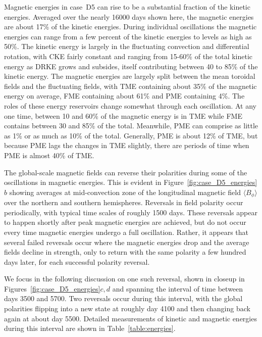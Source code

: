 Magnetic energies in case~D5 can rise to be a substantial
fraction of the kinetic energies.  Averaged over the nearly 16000 days
shown here, the magnetic energies are about 17\% of the kinetic
energies.  During individual oscillations the magnetic energies can
range from a few percent of the kinetic energies to levels as high as
50\%.  The kinetic energy is largely in the fluctuating convection and
differential rotation, with CKE fairly constant and ranging from
15-60\% of the total kinetic energy as DRKE grows and subsides, itself
contributing between 40 to 85\% of the kinetic energy.  The magnetic
energies are largely split between the mean toroidal fields and the
fluctuating fields, with TME containing about 35\% of the magnetic
energy on average, FME containing about 61\% and PME containing 4\%.
The roles of these energy reservoirs change somewhat through each
oscillation.  At any one time, between 10 and 60\% of the magnetic
energy is in TME while FME contains between 30 and 85\% of the total.
Meanwhile, PME can comprise as little as 1\% or as much as 10\% of the
total.  Generally, PME is about 12\% of TME, but because PME lags the
changes in TME slightly, there are periods of time when PME is almost
40\% of TME.


The global-scale magnetic fields can reverse their polarities during
some of the oscillations in magnetic energies.  This is evident in
Figure~\ref{fig:case_D5_energies}$b$ showing
averages at mid-convection zone of the longitudinal magnetic
field $\langle B_\phi \rangle$ over the northern and southern
hemispheres.  Reversals  in field polarity occur periodically, with
typical time scales of roughly 1500 days.  These reversals appear to
happen shortly after peak 
magnetic energies are achieved, but do not occur every time magnetic
energies undergo a full oscillation.  Rather, it appears that several
failed reversals occur where the magnetic energies drop and the
average fields decline in strength, only to return with the same
polarity a few hundred days later, for each successful polarity reversal.

We focus in the following discussion on one such reversal, shown in
closeup in Figures~\ref{fig:case_D5_energies}$c,d$ and spanning the
interval of time between days 3500 and 5700.  Two reversals occur during
this interval, with the global polarities flipping into a
new state at roughly day 4100 and then changing back again at about
day 5500.  Detailed measurements of kinetic and magnetic energies
during this interval are shown in Table~\ref{table:energies}. 

